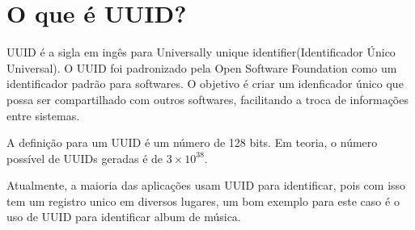 \section{O que é UUID?}
UUID é a sigla em ingês para Universally unique identifier(Identificador Único Universal).
O UUID foi padronizado pela Open Software Foundation como um identificador padrão para softwares.
O objetivo é criar um idenficador único que possa ser compartilhado com outros softwares, 
facilitando a troca de informações entre sistemas. 

A definição para um UUID é um número de 128 bits.
Em teoria, o número possível de UUIDs geradas é de $3 \times 10^{38}$.

Atualmente, a maioria das aplicações usam UUID para identificar, pois com isso tem um registro unico
em diversos lugares, um bom exemplo para este caso é o uso de UUID para identificar album de música.